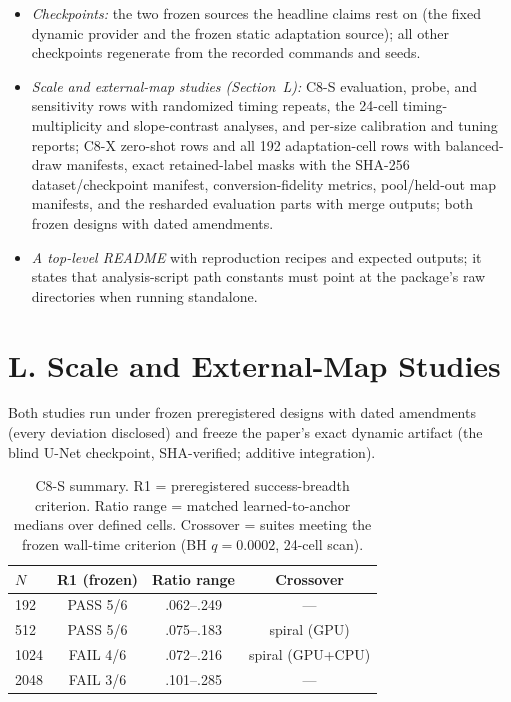 \documentclass[letterpaper]{article} %
\newcommand{\stage}[1]{\textsc{#1}}
\begin{document}
\begin{itemize}
    \item \emph{Checkpoints:} the two frozen sources the headline claims rest on (the fixed dynamic provider and the frozen static adaptation source); all other checkpoints regenerate from the recorded commands and seeds.
    \item \emph{Scale and external-map studies (Section~L):} \stage{C8-S} evaluation, probe, and sensitivity rows with randomized timing repeats, the 24-cell timing-multiplicity and slope-contrast analyses, and per-size calibration and tuning reports; \stage{C8-X} zero-shot rows and all 192 adaptation-cell rows with balanced-draw manifests, exact retained-label masks with the SHA-256 dataset/checkpoint manifest, conversion-fidelity metrics, pool/held-out map manifests, and the resharded evaluation parts with merge outputs; both frozen designs with dated amendments.
    \item \emph{A top-level README} with reproduction recipes and expected outputs; it states that analysis-script path constants must point at the package's raw directories when running standalone.
\end{itemize}

\section{L. Scale and External-Map Studies}

Both studies run under frozen preregistered designs with dated amendments (every deviation disclosed) and freeze the paper's exact dynamic artifact (the blind U-Net checkpoint, SHA-verified; additive integration).

\begin{table}[t]
\centering
\small
\setlength{\tabcolsep}{2.6pt}
\begin{tabular}{@{}lccc@{}}
\toprule
$N$ & R1 (frozen) & Ratio range & Crossover \\
\midrule
192 & PASS 5/6 & .062--.249 & --- \\
512 & PASS 5/6 & .075--.183 & spiral (GPU) \\
1024 & FAIL 4/6 & .072--.216 & spiral (GPU+CPU) \\
2048 & FAIL 3/6 & .101--.285 & --- \\
\bottomrule
\end{tabular}
\caption{\stage{C8-S} summary. R1 = preregistered success-breadth criterion. Ratio range = matched learned-to-anchor medians over defined cells. Crossover = suites meeting the frozen wall-time criterion (BH $q{=}0.0002$, 24-cell scan).}
\label{tab:c8s-summary}
\end{table}
\end{document}

